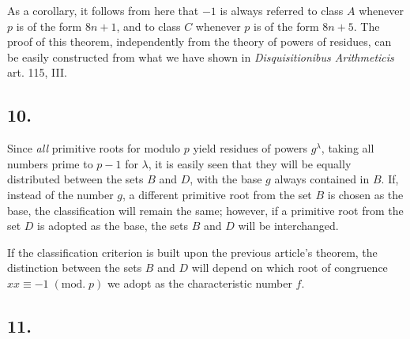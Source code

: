 \documentclass[twoside,12pt, showframe]{memoir}
\renewcommand{\pmod}[1]{\;(\textrm{mod.}\;#1)}
\begin{document}
As a corollary, it follows from here that \(-1\) is always referred to class \(A\) whenever \(p\) is of the form \(8n+1\), and to class \(C\) whenever \(p\) is of the form \(8n+5\).  The proof of this theorem, independently from the theory of powers of residues, can be easily constructed from what we have shown in \textit{Disquisitionibus Arithmeticis} art. 115, III.
%

\subsection*{10.}
 
Since \textit{all} primitive roots for modulo \(p\) yield residues of powers \(g^{\lambda}\), taking all numbers prime to \(p-1\) for \(\lambda\), it is easily seen that they will be equally distributed between the sets \({B}\) and \({D}\), with the base \(g\) always contained in \({B}\). If, instead of the number \(g\), a different primitive root from the set \(B\) is chosen as the base, the classification will remain the same; however, if a primitive root from the set \(D\) is adopted as the base, the sets \(B\) and \(D\) will be interchanged.
 
If the classification criterion is built upon the previous article's theorem, the distinction between the sets \(B\) and \(D\) will depend on which root of congruence \(x x \equiv-1\pmod{p}\) we adopt as the characteristic number \(f\).
%

\subsection*{11.}
 
\end{document}
